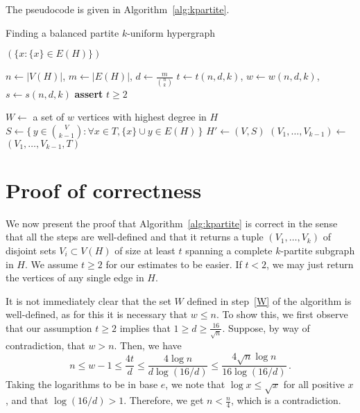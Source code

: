The pseudocode is given in Algorithm~\ref{alg:kpartite}.

\begin{algorithm}[H]
    \caption{Finding a balanced partite $k$-uniform hypergraph}
    \label{alg:kpartite}
    \begin{algorithmic}[1]
                \State \Return $(\{x \colon \{x\} \in E(H)\})$
            \EndIf

            \State $n \gets |V(H)|$, $m \gets |E(H)|$, $d \gets \frac{m}{\binom{n}{k}}$
            \State $t \gets t(n, d, k)$, $w \gets w(n, d, k)$, $s \gets s(n, d, k)$
            \State \textbf{assert} $t \ge 2$

            \State $W \gets$ a set of $w$ vertices with highest degree in $H$
                \State $S \gets \{\,y \in \binom{V}{k-1} \colon \forall x \in T, \{x\} \cup y \in E(H)\,\}$
                    \State $H' \gets (V, S)$  
                    \State $(V_1, \dots, V_{k-1}) \gets$  \label{recurse}
                    \State \Return $(V_1, \dots, V_{k-1}, T)$
                \EndIf
            \EndFor
        \EndFunction
    \end{algorithmic}
\end{algorithm}
\newpage

\section{Proof of correctness}\label{sec:correctness}

We now present the proof that Algorithm~\ref{alg:kpartite} is correct in the sense that
all the steps are well-defined and that it returns a tuple $(V_1, \dots, V_k)$ of disjoint sets $V_i \subset V(H)$
of size at least $t$ spanning a complete $k$-partite subgraph in $H$.
We assume $t \ge 2$ for our estimates to be easier.
If $t < 2$, we may just return the vertices of any single edge in $H$.

It is not immediately clear that the set $W$ defined in step~\ref{W} of the algorithm
is well-defined, as for this it is necessary that $w \leq n$.
To show this, we first observe that our assumption $t \geq 2$
implies that $ 1 \geq d \geq \frac{16}{\sqrt{n}}$.
Suppose, by way of contradiction, that $w > n$.
Then, we have
\[
    n \leq w - 1 \leq \frac{4t}{d} \leq \frac{4\log n}{d\log(16/d)} \leq \frac{4 \sqrt{n} \log n }{16 \log(16/d)}\,.
\]
Taking the logarithms to be in base $e$, we note that $\log x \leq \sqrt{x}$ for all positive $x$,
and that $\log(16/d) > 1$.
Therefore, we get $n < \frac{n}{4}$, which is a contradiction.

